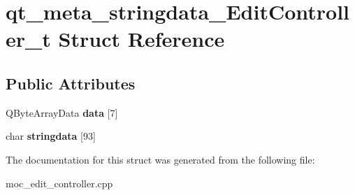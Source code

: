 \hypertarget{structqt__meta__stringdata__EditController__t}{\section{qt\-\_\-meta\-\_\-stringdata\-\_\-\-Edit\-Controller\-\_\-t Struct Reference}
\label{structqt__meta__stringdata__EditController__t}
}
\subsection*{Public Attributes}
\begin{DoxyCompactItemize}
\item 
\hypertarget{structqt__meta__stringdata__EditController__t_a2716172019b9fbd21e877dbe6f8117bc}{Q\-Byte\-Array\-Data {\bfseries data} \mbox{[}7\mbox{]}}\label{structqt__meta__stringdata__EditController__t_a2716172019b9fbd21e877dbe6f8117bc}

\item 
\hypertarget{structqt__meta__stringdata__EditController__t_a06af1fa92901601d0828b833194ec3de}{char {\bfseries stringdata} \mbox{[}93\mbox{]}}\label{structqt__meta__stringdata__EditController__t_a06af1fa92901601d0828b833194ec3de}

\end{DoxyCompactItemize}


The documentation for this struct was generated from the following file\-:\begin{DoxyCompactItemize}
\item 
moc\-\_\-edit\-\_\-controller.\-cpp\end{DoxyCompactItemize}
